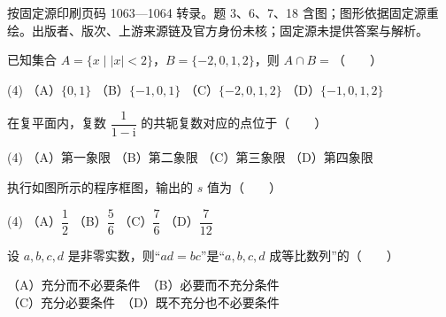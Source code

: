 


\begin{gktip}
按固定源印刷页码 1063—1064 转录。题 3、6、7、18 含图；图形依据固定源重绘。出版者、版次、上游来源链及官方身份未核；固定源未提供答案与解析。
\end{gktip}


\begin{question}
已知集合 $A=\{x\mid |x|<2\}$，$B=\{-2,0,1,2\}$，则 $A\cap B=$\mbox{（　　）}

\begin{gkopts}(4)
\task （A）$\{0,1\}$
\task （B）$\{-1,0,1\}$
\task （C）$\{-2,0,1,2\}$
\task （D）$\{-1,0,1,2\}$
\end{gkopts}

\end{question}
\begin{question}
在复平面内，复数 $\dfrac{1}{1-\mathrm i}$ 的共轭复数对应的点位于\mbox{（　　）}

\begin{gkopts}(4)
\task （A）第一象限
\task （B）第二象限
\task （C）第三象限
\task （D）第四象限
\end{gkopts}

\Needspace{0.4\textheight}
\end{question}
\begin{question}
执行如图所示的程序框图，输出的 $s$ 值为\mbox{（　　）}
\nopagebreak[4]
\begin{center}\end{center}
\nopagebreak[4]
\begin{gkopts}(4)
\task （A）$\dfrac12$
\task （B）$\dfrac56$
\task （C）$\dfrac76$
\task （D）$\dfrac7{12}$
\end{gkopts}

\end{question}
\begin{question}
设 $a,b,c,d$ 是非零实数，则“$ad=bc$”是“$a,b,c,d$ 成等比数列”的\mbox{（　　）}

（A）充分而不必要条件　（B）必要而不充分条件\\
（C）充分必要条件　（D）既不充分也不必要条件

\end{question}
